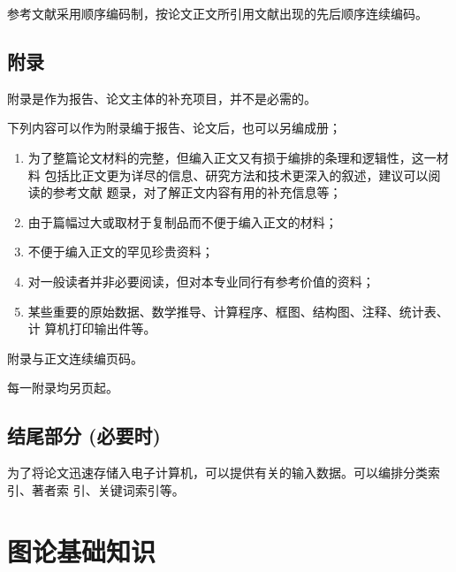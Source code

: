 \documentclass[master]{njuthesis}
\begin{document}
参考文献采用顺序编码制，按论文正文所引用文献出现的先后顺序连续编码。

\section{附录}

附录是作为报告、论文主体的补充项目，并不是必需的。

下列内容可以作为附录编于报告、论文后，也可以另编成册；

\begin{enumerate}
\item 为了整篇论文材料的完整，但编入正文又有损于编排的条理和逻辑性，这一材料
包括比正文更为详尽的信息、研究方法和技术更深入的叙述，建议可以阅读的参考文献
题录，对了解正文内容有用的补充信息等；
\item 由于篇幅过大或取材于复制品而不便于编入正文的材料；
\item 不便于编入正文的罕见珍贵资料；
\item 对一般读者并非必要阅读，但对本专业同行有参考价值的资料；
\item 某些重要的原始数据、数学推导、计算程序、框图、结构图、注释、统计表、计
算机打印输出件等。
\end{enumerate}

附录与正文连续编页码。

每一附录均另页起。

\section{结尾部分 (必要时)}

为了将论文迅速存储入电子计算机，可以提供有关的输入数据。可以编排分类索引、著者索
引、关键词索引等。

\nocite{*}

%
%

\appendix
\chapter{图论基础知识}
\end{document}
